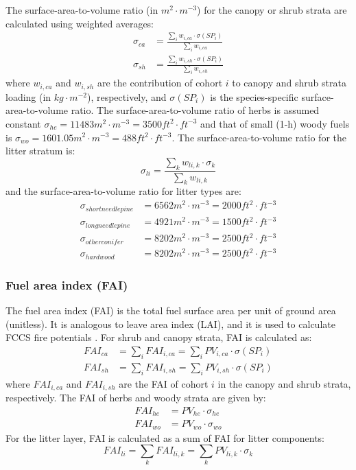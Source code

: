 \documentclass[]{book}
\begin{document}
The surface-area-to-volume ratio (in \(m^2\cdot m^{-3}\)) for the canopy or shrub strata are calculated using weighted averages:
\begin{eqnarray}
\sigma_{ca} &= \frac{\sum_{i}{w_{i,ca} \cdot \sigma(SP_i)}}{\sum_{i}{w_{i,ca}}}\\
\sigma_{sh} &= \frac{\sum_{i}{w_{i,sh} \cdot \sigma(SP_i)}}{\sum_{i}{w_{i,sh}}}
\end{eqnarray}
where \(w_{i,ca}\) and \(w_{i,sh}\) are the contribution of cohort \(i\) to canopy and shrub strata loading (in \(kg\cdot m^{-2}\)), respectively, and \(\sigma(SP_i)\) is the species-specific surface-area-to-volume ratio. The surface-area-to-volume ratio of herbs is assumed constant \(\sigma_{he} = 11483 m^2\cdot m^{-3} = 3500 ft^2\cdot ft^{-3}\) and that of small (1-h) woody fuels is \(\sigma_{wo} = 1601.05 m^2\cdot m^{-3} = 488 ft^2\cdot ft^{-3}\). The surface-area-to-volume ratio for the litter stratum is:
\begin{equation}
\sigma_{li} = \frac{\sum_{k}{w_{li,k} \cdot \sigma_{k}}}{\sum_{k}{w_{li,k}}}
\end{equation}
and the surface-area-to-volume ratio for litter types are:
\begin{eqnarray}
\sigma_{shortneedlepine} &= 6562 m^{2}\cdot m^{-3}= 2000 ft^{2}\cdot ft^{-3}\\
\sigma_{longneedlepine} &= 4921 m^{2}\cdot m^{-3}= 1500 ft^{2}\cdot ft^{-3}\\
\sigma_{otherconifer} &= 8202 m^{2}\cdot m^{-3}= 2500 ft^{2}\cdot ft^{-3}\\
\sigma_{hardwood} &= 8202 m^{2}\cdot m^{-3}= 2500 ft^{2}\cdot ft^{-3}
\end{eqnarray}

\hypertarget{fuel-area-index-fai}{%
\subsubsection{Fuel area index (FAI)}\label{fuel-area-index-fai}}

The fuel area index (FAI) is the total fuel surface area per unit of ground area (unitless). It is analogous to leave area index (LAI), and it is used to calculate FCCS fire potentials \citep{Schaaf2007}. For shrub and canopy strata, FAI is calculated as:
\begin{eqnarray}
FAI_{ca} &= \sum_{i}{FAI_{i, ca}} = \sum_{i}{PV_{i,ca} \cdot\sigma(SP_i)}\\
FAI_{sh} &= \sum_{i}{FAI_{i, sh}}= \sum_{i}{PV_{i,sh} \cdot \sigma(SP_i)}
\end{eqnarray}
where \(FAI_{i, ca}\) and \(FAI_{i, sh}\) are the FAI of cohort \(i\) in the canopy and shrub strata, respectively. The FAI of herbs and woody strata are given by:
\begin{eqnarray}
FAI_{he} &= PV_{he} \cdot \sigma_{he}\\
FAI_{wo} &= PV_{wo} \cdot \sigma_{wo}
\end{eqnarray}
For the litter layer, FAI is calculated as a sum of FAI for litter components:
\begin{equation}
FAI_{li} = \sum_{k}{FAI_{li,k}} = \sum_{k}{PV_{li,k} \cdot \sigma_{k}}
\end{equation}
\end{document}
